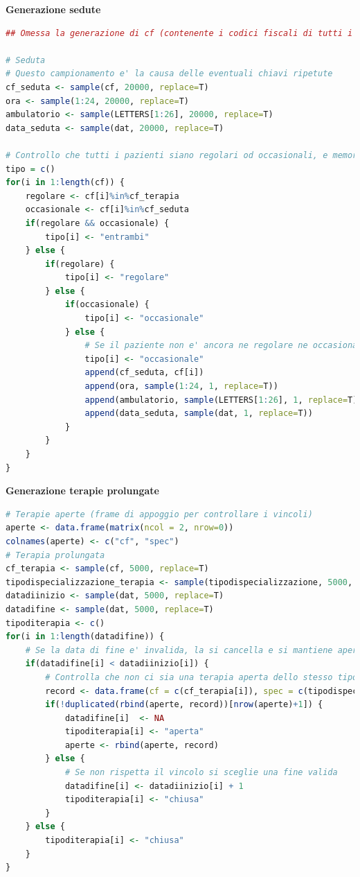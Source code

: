 \documentclass[11pt]{article}
\begin{document}
\textbf{Generazione sedute}
\begin{lstlisting}[language=R]
## Omessa la generazione di cf (contenente i codici fiscali di tutti i pazienti) e cf_terapia (contenente i codici dei pazienti in terapia prolungata)

# Seduta
# Questo campionamento e' la causa delle eventuali chiavi ripetute
cf_seduta <- sample(cf, 20000, replace=T)
ora <- sample(1:24, 20000, replace=T)
ambulatorio <- sample(LETTERS[1:26], 20000, replace=T)
data_seduta <- sample(dat, 20000, replace=T)

# Controllo che tutti i pazienti siano regolari od occasionali, e memorizzo l'informazione su un array
tipo = c()
for(i in 1:length(cf)) {
    regolare <- cf[i]%in%cf_terapia
    occasionale <- cf[i]%in%cf_seduta
    if(regolare && occasionale) {
        tipo[i] <- "entrambi"
    } else {
        if(regolare) {
            tipo[i] <- "regolare"
        } else {
            if(occasionale) {
                tipo[i] <- "occasionale"
            } else {
                # Se il paziente non e' ancora ne regolare ne occasionale, aggiungo una seduta rendendolo occasionale
                tipo[i] <- "occasionale"
                append(cf_seduta, cf[i])
                append(ora, sample(1:24, 1, replace=T))
                append(ambulatorio, sample(LETTERS[1:26], 1, replace=T))
                append(data_seduta, sample(dat, 1, replace=T))
            }
        }
    }
}
\end{lstlisting}

\textbf{Generazione terapie prolungate}
\begin{lstlisting}[language=R]
# Terapie aperte (frame di appoggio per controllare i vincoli)
aperte <- data.frame(matrix(ncol = 2, nrow=0))
colnames(aperte) <- c("cf", "spec")
# Terapia prolungata
cf_terapia <- sample(cf, 5000, replace=T)
tipodispecializzazione_terapia <- sample(tipodispecializzazione, 5000, replace=T)
datadiinizio <- sample(dat, 5000, replace=T)
datadifine <- sample(dat, 5000, replace=T)
tipoditerapia <- c()
for(i in 1:length(datadifine)) {
    # Se la data di fine e' invalida, la si cancella e si mantiene aperta la terapia
    if(datadifine[i] < datadiinizio[i]) {
        # Controlla che non ci sia una terapia aperta dello stesso tipo per lo stesso paziente
        record <- data.frame(cf = c(cf_terapia[i]), spec = c(tipodispecializzazione_terapia[i]))
        if(!duplicated(rbind(aperte, record))[nrow(aperte)+1]) {
            datadifine[i]  <- NA
            tipoditerapia[i] <- "aperta"
            aperte <- rbind(aperte, record)
        } else {
            # Se non rispetta il vincolo si sceglie una fine valida
            datadifine[i] <- datadiinizio[i] + 1
            tipoditerapia[i] <- "chiusa"
        }
    } else {
        tipoditerapia[i] <- "chiusa"
    }
}
\end{lstlisting}
\end{document}
